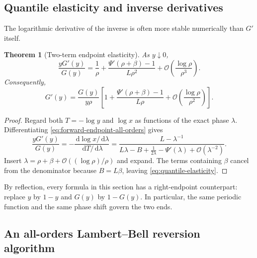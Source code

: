 \documentclass[11pt,oneside]{article}
\numberwithin{equation}{section}
\newtheorem{theorem}{Theorem}[section]
\theoremstyle{definition}
\theoremstyle{remark}
\newcommand{\dd}{\,\mathrm d}
\newcommand{\bigO}{\mathcal O}
\begin{document}
\subsection{Quantile elasticity and inverse derivatives}

The logarithmic derivative of the inverse is often more stable numerically than $G'$ itself.

\begin{theorem}[Two-term endpoint elasticity]
\label{thm:quantile-elasticity}
As $y\downarrow0$,
\begin{equation}
 \boxed{
 \frac{yG'(y)}{G(y)}
 =\frac1\rho+\frac{\Psi'(\rho+\beta)-1}{L\rho^2}
 +\bigO\!\left(\frac{\log\rho}{\rho^3}\right).}
 \label{eq:quantile-elasticity}
\end{equation}
Consequently,
\begin{equation}
 G'(y)=\frac{G(y)}{y\rho}
 \left[1+\frac{\Psi'(\rho+\beta)-1}{L\rho}
 +\bigO\!\left(\frac{\log\rho}{\rho^2}\right)\right].
 \label{eq:Gprime-endpoint}
\end{equation}
\end{theorem}

\begin{proof}
Regard both $T=-\log y$ and $\log x$ as functions of the exact phase $\lambda$.
Differentiating \eqref{eq:forward-endpoint-all-orders} gives
\begin{equation}
 \frac{yG'(y)}{G(y)}
 =-\frac{\dd\log x/\dd\lambda}{\dd T/\dd\lambda}
 =\frac{L-\lambda^{-1}}
 {L\lambda-B+\tfrac1{2\lambda}-\Psi'(\lambda)+\bigO(\lambda^{-2})}.
 \label{eq:elasticity-exact-ratio}
\end{equation}
Insert $\lambda=\rho+\beta+\bigO((\log\rho)/\rho)$ and expand.  The terms
containing $\beta$ cancel from the denominator because $B=L\beta$, leaving
\eqref{eq:quantile-elasticity}.
\end{proof}

By reflection, every formula in this section has a right-endpoint counterpart: replace
$y$ by $1-y$ and $G(y)$ by $1-G(y)$.  In particular, the same periodic function and
the same phase shift govern the two ends.

\subsection{An all-orders Lambert--Bell reversion algorithm}
\end{document}
